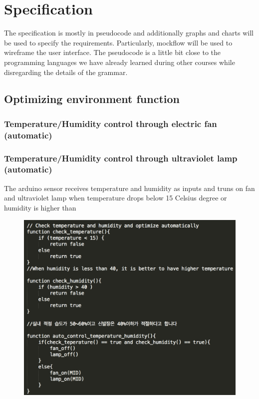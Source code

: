 \documentclass[conference]{IEEEtran}
\begin{document}
\section{Specification}
The specification is mostly in pseudocode and additionally graphs and charts will be used to specify the requirements. Particularly, mockflow will be used to wireframe the user interface. The pseudocode is a little bit close to the programming languages we have already learned during other courses while disregarding the details of the grammar.
\subsection{Optimizing environment function}
\subsubsection{Temperature/Humidity control through electric fan (automatic)}
\subsubsection{Temperature/Humidity control through ultraviolet lamp (automatic)}
The arduino sensor receives temperature and humidity as inputs and truns on fan and ultraviolet lamp when temperature drops below 15 Celsius degree or humidity is higher than 
\begin{figure}[htbp]
\begin{center}
    \includegraphics[scale=0.48]{optimization1}
    \label{fig:label}
\end{center}
\end{figure}
\end{document}

